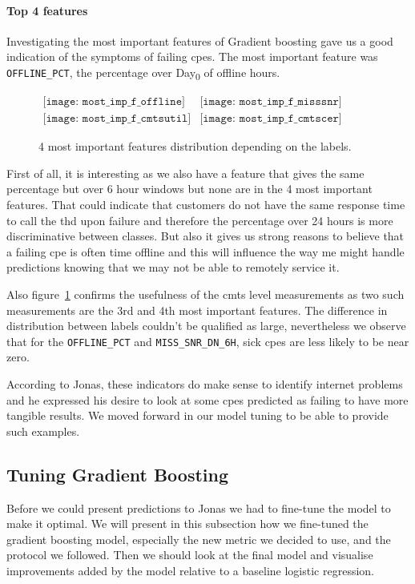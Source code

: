 \paragraph{Top 4 features}
Investigating the most important features of Gradient boosting gave us a good indication of the symptoms of failing \acrshort{cpe}s. The most important feature was \texttt{OFFLINE\_PCT}, the percentage over Day\textsubscript{0} of offline hours. 


\begin{figure}[h]
\begin{center}$
\begin{array}{cc}
\texttt{[image: most\_imp\_f\_offline]} &
\texttt{[image: most\_imp\_f\_misssnr]} \\
\texttt{[image: most\_imp\_f\_cmtsutil]} &
\texttt{[image: most\_imp\_f\_cmtscer]}
\end{array}$
\end{center}
\caption{\label{most_important} 4 most important features distribution depending on the labels.}
\end{figure}


First of all, it is interesting as we also have a feature that gives the same percentage but over 6 hour windows but none are in the 4 most important features. That could indicate that customers do not have the same response time to call the \acrshort{thd} upon failure and therefore the percentage over 24 hours is more discriminative between classes. But also it gives us strong reasons to believe that a failing \acrshort{cpe} is often time offline and this will influence the way me might handle predictions knowing that we may not be able to remotely service it. 

Also figure~\ref{most_important} confirms the usefulness of the \acrshort{cmts} level measurements as two such measurements are the 3rd and 4th most important features. The difference in distribution between labels couldn't be qualified as large, nevertheless we observe that for the \texttt{OFFLINE\_PCT} and \texttt{MISS\_SNR\_DN\_6H}, sick \acrshort{cpe}s are less likely to be near zero.

According to Jonas, these indicators do make sense to identify internet problems and he expressed his desire to look at some \acrshort{cpe}s predicted as failing to have more tangible results. We moved forward in our model tuning to be able to provide such examples. 

\subsection{Tuning Gradient Boosting}
Before we could present predictions to Jonas we had to fine-tune the model to make it optimal. We will present in this subsection how we fine-tuned the gradient boosting model, especially the new metric we decided to use, and the protocol we followed. Then we should look at the final model and visualise improvements added by the model relative to a baseline logistic regression.

